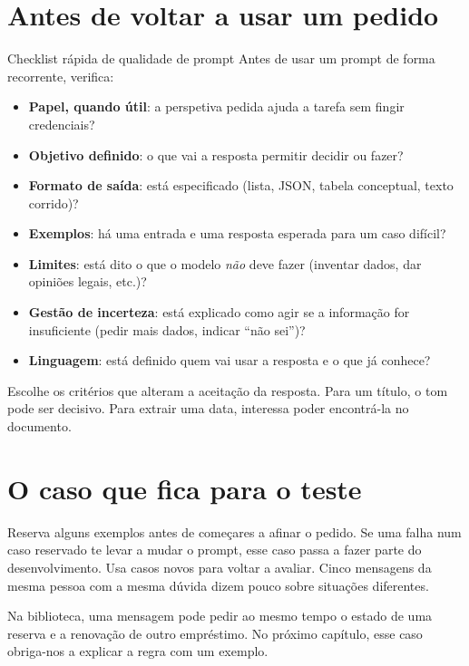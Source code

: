 \section{Antes de voltar a usar um pedido}

\begin{checklistbox}{Checklist rápida de qualidade de prompt}
Antes de usar um prompt de forma recorrente, verifica:

\begin{itemize}[leftmargin=*]
\item \textbf{Papel, quando útil}: a perspetiva pedida ajuda a tarefa sem fingir credenciais?
\item \textbf{Objetivo definido}: o que vai a resposta permitir decidir ou fazer?
\item \textbf{Formato de saída}: está especificado (lista, JSON, tabela conceptual, texto corrido)?
\item \textbf{Exemplos}: há uma entrada e uma resposta esperada para um caso difícil?
\item \textbf{Limites}: está dito o que o modelo \emph{não} deve fazer (inventar dados, dar opiniões legais, etc.)?
\item \textbf{Gestão de incerteza}: está explicado como agir se a informação for insuficiente (pedir mais dados, indicar “não sei”)?
\item \textbf{Linguagem}: está definido quem vai usar a resposta e o que já conhece?
\end{itemize}
\end{checklistbox}

Escolhe os critérios que alteram a aceitação da resposta. Para um título, o tom pode ser decisivo. Para extrair uma data, interessa poder encontrá-la no documento.

\section{O caso que fica para o teste}
Reserva alguns exemplos antes de começares a afinar o pedido. Se uma falha num caso reservado te levar a mudar o prompt, esse caso passa a fazer parte do desenvolvimento. Usa casos novos para voltar a avaliar. Cinco mensagens da mesma pessoa com a mesma dúvida dizem pouco sobre situações diferentes.

Na biblioteca, uma mensagem pode pedir ao mesmo tempo o estado de uma reserva e a renovação de outro empréstimo. No próximo capítulo, esse caso obriga-nos a explicar a regra com um exemplo.
